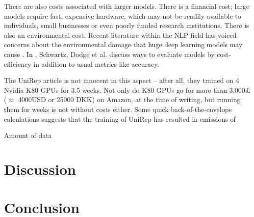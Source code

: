 \documentclass[a4paper,12pt]{article}
\begin{document}
There are also costs associated with larger models. There is a financial cost; large models require fast, expensive hardware, which may not be readily available to individuals, small businesses or even poorly funded research institutions. There is also an environmental cost. Recent literature within the NLP field has voiced concerns about the environmental damage that huge deep learning models may cause \cite{strubell2019energy}. In \cite{greenai}, Schwartz, Dodge et al. discuss ways to evaluate models by cost-efficiency in addition to usual metrics like accuracy.

The UniRep article is not innocent in this aspect -- after all, they trained on 4 Nvidia K80 GPUs for 3.5 weeks. Not only do K80 GPUs go for more than 3,000£ ($\approx$ 4000USD or 25000 DKK) on Amazon, at the time of writing, but running them for weeks is not without costs either. Some quick back-of-the-envelope calculations suggests that the training of UniRep has resulted in emissions of 

Amount of data

\clearpage
\section{Discussion}




\clearpage
\section{Conclusion}


\clearpage
{}
\printbibliography[title={References}]
\end{document}
